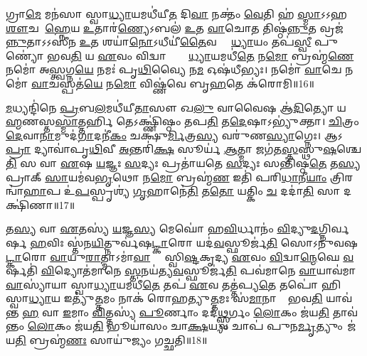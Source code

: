 𑌗𑍍𑌰𑌾\ul{𑌮𑍇} 𑌮𑌨॑𑌸𑌾 𑌸𑍍𑌵𑌾\ul{𑌧𑍍𑌯𑌾}𑌯𑌮𑌧𑍀॑𑌯𑍀\ul{𑌤} 𑌦𑌿\ul{𑌵𑌾} 𑌨𑌕𑍍𑌤𑌂॑ \ul{𑌵𑍇}𑌤𑌿 𑌹॑ \ul{𑌸𑍍𑌮𑌾}𑌽𑌽𑌹 \ul{𑌶𑍗}𑌚 𑌆᳚\ul{𑌹𑍍𑌨𑍇}𑌯 \ul{𑌉}𑌤𑌾𑌰॑\ul{𑌣𑍍𑌯𑍇}𑌽𑌬𑌲॑ \ul{𑌉}𑌤 \ul{𑌵𑌾}𑌚𑍋𑌤 𑌤𑌿𑌷𑍍𑌠॑\ul{𑌨𑍍𑌨𑍁}𑌤 𑌵𑍍𑌰𑌜॑\ul{𑌨𑍍𑌨𑍁}𑌤𑌾𑌽𑌽𑌸𑍀॑𑌨 \ul{𑌉}𑌤 𑌶𑌯𑌾॑\ul{𑌨𑍋}𑌽𑌧𑍀𑌯𑍀॑\ul{𑌤𑍈}𑌵 𑌸𑍍𑌵𑌾᳚\ul{𑌧𑍍𑌯𑌾}𑌯𑌂 𑌤𑌪॑\ul{𑌸𑍍𑌵𑍀} 𑌪𑍁𑌣𑍍𑌯𑍋॑ 𑌭𑌵\ul{𑌤𑌿} 𑌯 \ul{𑌏}𑌵𑌂 𑌵𑌿𑌦𑍍𑌵𑌾𑌨𑍍𑌥𑍍𑌸𑍍𑌵𑌾᳚᳚\ul{𑌧𑍍𑌯𑌾}𑌯𑌮𑌧𑍀॑\ul{𑌤𑍇} 𑌨\ul{𑌮𑍋} 𑌬𑍍𑌰𑌹𑍍𑌮॑\ul{𑌣𑍇} 𑌨𑌮𑍋॑ 𑌅\ul{𑌸𑍍𑌤𑍍𑌵}𑌗𑍍𑌨\ul{𑌯𑍇} 𑌨𑌮𑌃॑ 𑌪𑍃\ul{𑌥𑌿}𑌵𑍍𑌯𑍈 𑌨\ul{𑌮} 𑌓𑌷॑𑌧𑍀𑌭𑍍𑌯𑌃। 
𑌨𑌮𑍋॑ \ul{𑌵𑌾}𑌚𑍇 𑌨𑌮𑍋॑ \ul{𑌵𑌾}𑌚𑌸𑍍𑌪𑌤॑\ul{𑌯𑍇} 𑌨\ul{𑌮𑍋} 𑌵𑌿𑌷𑍍𑌣॑𑌵𑍇 𑌬𑍃\ul{𑌹}𑌤𑍇 𑌕॑𑌰𑍋𑌮𑌿॥16॥
\anuvakamend


\ul{𑌮}𑌧𑍍𑌯𑌨𑍍𑌦𑌿॑𑌨𑍇 \ul{𑌪𑍍𑌰}𑌬\ul{𑌲}𑌮𑌧𑍀॑𑌯𑍀\ul{𑌤𑌾}𑌸𑍗 𑌖\ul{𑌲𑍁} 𑌵𑌾𑌵𑍈𑌷 𑌆॑\ul{𑌦𑌿}𑌤𑍍𑌯𑍋 𑌯𑌦𑍍𑌬𑍍𑌰𑌾᳚\ul{𑌹𑍍𑌮}𑌣\-𑌸𑍍𑌤\ul{𑌸𑍍𑌮𑌾}𑌤𑍍𑌤𑌰𑍍\mbox{}\ul{𑌹𑌿} 𑌤𑍇𑌽𑌕𑍍𑌷𑍍𑌣𑌿॑𑌷𑍍𑌠𑌂 𑌤𑌪\ul{𑌤𑌿} 𑌤\ul{𑌦𑍇}𑌷𑌾𑌽𑌭𑍍𑌯𑍁॑𑌕𑍍𑌤𑌾। 
\ul{𑌚𑌿}𑌤𑍍𑌰𑌂 \ul{𑌦𑍇}𑌵𑌾\ul{𑌨𑌾}𑌮𑍁𑌦॑\ul{𑌗𑌾}\-𑌦𑌨𑍀॑\ul{𑌕𑌂} 𑌚𑌕𑍍𑌷𑍁॑\ul{𑌰𑍍𑌮𑌿}𑌤𑍍𑌰\ul{𑌸𑍍𑌯} 𑌵𑌰𑍁॑𑌣\ul{𑌸𑍍𑌯𑌾}𑌗𑍍𑌨𑍇𑌃। 
𑌆𑌽\ul{𑌪𑍍𑌰𑌾} 𑌦𑍍𑌯𑌾𑌵𑌾॑𑌪𑍃\ul{𑌥𑌿}𑌵𑍀 \ul{𑌅}𑌨𑍍𑌤𑌰𑌿॑\ul{𑌕𑍍𑌷}\ul{} 𑌸𑍂𑌰𑍍𑌯॑ \ul{𑌆}𑌤𑍍𑌮𑌾 𑌜𑌗॑𑌤\ul{𑌸𑍍𑌤}𑌸𑍍𑌥𑍁\ul{𑌷}𑌶𑍍𑌚𑍇\ul{𑌤𑌿} 𑌸 𑌵𑌾 \ul{𑌏}𑌷 \ul{𑌯}𑌜𑍍𑌞𑌃 \ul{𑌸}𑌦𑍍𑌯𑌃 𑌪𑍍𑌰𑌤𑌾॑𑌯𑌤𑍇 \ul{𑌸}𑌦𑍍𑌯𑌃 𑌸𑌨𑍍𑌤𑌿॑𑌷𑍍𑌠\ul{𑌤𑍇} 𑌤\ul{𑌸𑍍𑌯} 𑌪𑍍𑌰𑌾𑌕𑍍 \ul{𑌸𑌾}𑌯𑌮॑𑌵\ul{𑌭𑍃}𑌥𑍋 𑌨\ul{𑌮𑍋} 𑌬𑍍𑌰𑌹𑍍𑌮॑\ul{𑌣} 𑌇𑌤𑌿॑ 𑌪𑌰𑌿\ul{𑌧𑌾}𑌨𑍀\ul{𑌯𑌾𑌂} 𑌤𑍍𑌰𑌿𑌰𑌨𑍍𑌵𑌾॑\ul{𑌹𑌾}𑌪 𑌉॑\ul{𑌪}𑌸𑍍𑌪𑍃𑌶𑍍𑌯॑ \ul{𑌗𑍃}𑌹𑌾𑌨𑍇॑\ul{𑌤𑌿} 𑌤\ul{𑌤𑍋} 𑌯𑌤𑍍𑌕𑌿𑌂 \ul{𑌚} 𑌦𑌦𑌾॑\ul{𑌤𑌿} 𑌸𑌾 𑌦𑌕𑍍𑌷𑌿॑𑌣𑌾॥17॥\anuvakamend


𑌤\ul{𑌸𑍍𑌯} 𑌵𑌾 \ul{𑌏}𑌤𑌸𑍍𑌯॑ \ul{𑌯}𑌜𑍍𑌞\ul{𑌸𑍍𑌯} 𑌮𑍇𑌘𑍋॑ 𑌹\ul{𑌵𑌿}𑌰𑍍𑌧𑌾𑌨𑌂॑ \ul{𑌵𑌿}𑌦𑍍𑌯𑍁\ul{𑌦}𑌗𑍍𑌨𑌿𑌰𑍍\mbox{}\ul{𑌵}𑌰𑍍\mbox{}𑌷 \ul{𑌹}𑌵𑌿𑌃 𑌸𑍍𑌤॑𑌨\ul{𑌯𑌿}𑌤𑍍𑌨𑍁𑌰𑍍𑌵॑𑌷\ul{𑌟𑍍𑌕𑌾}𑌰𑍋 𑌯𑌦॑\ul{𑌵}𑌸𑍍𑌫𑍂𑌰𑍍𑌜॑\ul{𑌤𑌿} 𑌸𑍋𑌽𑌨𑍁॑𑌵𑌷\ul{𑌟𑍍𑌕𑌾}𑌰𑍋 \ul{𑌵𑌾}𑌯𑍁\ul{𑌰𑌾}𑌤𑍍𑌮𑌾𑌽𑌮𑌾॑\ul{𑌵𑌾}𑌸𑍍𑌯𑌾᳚ 𑌸𑍍𑌵𑌿\ul{𑌷𑍍𑌟}𑌕𑍃𑌦𑍍𑌯 \ul{𑌏}𑌵𑌂 \ul{𑌵𑌿}𑌦𑍍𑌵𑌾\ul{𑌨𑍍𑌮𑍇}𑌘𑍇 \ul{𑌵}𑌰𑍍\mbox{}𑌷𑌤𑌿॑ \ul{𑌵𑌿}𑌦𑍍𑌯𑍋𑌤॑𑌮𑌾𑌨𑍇 \ul{𑌸𑍍𑌤}𑌨𑌯॑𑌤𑍍𑌯\ul{𑌵}𑌸𑍍𑌫𑍂𑌰𑍍𑌜॑\ul{𑌤𑌿} 𑌪𑌵॑𑌮𑌾𑌨𑍇 \ul{𑌵𑌾}𑌯𑌾𑌵॑𑌮𑌾\ul{𑌵𑌾}𑌸𑍍𑌯𑌾॑𑌯𑌾 𑌸𑍍𑌵𑌾\ul{𑌧𑍍𑌯𑌾}𑌯𑌮𑌧𑍀॑\ul{𑌤𑍇} 𑌤𑌪॑ \ul{𑌏}𑌵 𑌤𑌤𑍍𑌤॑𑌪𑍍𑌯\ul{𑌤𑍇} 𑌤𑌪𑍋॑ 𑌹𑌿 𑌸𑍍𑌵𑌾\ul{𑌧𑍍𑌯𑌾}𑌯 𑌇𑌤𑍍𑌯𑍁॑\ul{𑌤𑍍𑌤}𑌮𑌂 𑌨𑌾𑌕॑ 𑌰𑍋𑌹𑌤𑍍𑌯𑍁\ul{𑌤𑍍𑌤}𑌮𑌃 𑌸॑\ul{𑌮𑌾}𑌨𑌾𑌨𑌾𑌂᳚ 𑌭𑌵\ul{𑌤𑌿} 𑌯𑌾𑌵॑𑌨𑍍𑌤 \ul{𑌹} 𑌵𑌾 \ul{𑌇}𑌮𑌾𑌂 \ul{𑌵𑌿}𑌤𑍍𑌤𑌸𑍍𑌯॑ \ul{𑌪𑍂}𑌰𑍍𑌣𑌾𑌂 𑌦𑌦॑\ul{𑌥𑍍𑌸𑍍𑌵}𑌰𑍍𑌗𑌂 \ul{𑌲𑍋}𑌕𑌂 𑌜॑𑌯\ul{𑌤𑌿} 𑌤𑌾𑌵॑𑌨𑍍𑌤𑌂 \ul{𑌲𑍋}𑌕𑌂 𑌜॑𑌯\ul{𑌤𑌿} 𑌭𑍂𑌯𑌾॑𑌸𑌂 𑌚𑌾\ul{𑌕𑍍𑌷}𑌯𑍍𑌯𑌂 𑌚𑌾𑌪॑ 𑌪𑍁𑌨\ul{𑌰𑍍𑌮𑍃}𑌤𑍍𑌯𑍁𑌂 𑌜॑𑌯\ul{𑌤𑌿} 𑌬𑍍𑌰𑌹𑍍𑌮॑\ul{𑌣𑌃} 𑌸𑌾𑌯𑍁॑𑌜𑍍𑌯𑌂 𑌗𑌚𑍍𑌛𑌤𑌿॥18॥\anuvakamend


